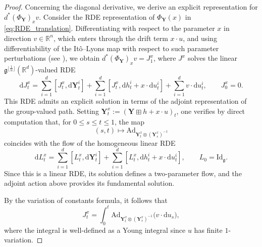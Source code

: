 \documentclass[12pt,a4paper]{article}
\numberwithin{equation}{section}
\def\fY{\mathbf{Y}}\newcommand{\norm}[1]{\left\lVert#1\right\rVert}
\theoremstyle{plain}
\theoremstyle{definition}
\theoremstyle{remark}
\begin{document}
\begin{proof}
Concerning the diagonal derivative, we derive an explicit representation for \( d^*(\Phi_\fY)_x v \). Consider the RDE representation of \( \Phi_\fY(x) \) in \eqref{eq:RDE_translation}. Differentiating with respect to the parameter \(x\) in direction \(v \in \mathbb{R}^n\), which enters through the drift term \(x \cdot u\), and using differentiability of the It\^{o}--Lyons map with respect to such parameter perturbations (see \cite[Theorem 11.6]{frizbook}), we obtain $d^* (\Phi_\fY)_x v=J_1^x$, where \(J^x\) solves the linear \(\mathfrak{g}^{\lfloor \frac{1}{\alpha}  \rfloor}(\mathbb{R}^d)\)-valued RDE
\begin{equation}\label{Lie_RDE}
\mathrm{d}J_t^x = \sum_{i=1}^d  [J_t^x, \mathrm{d}\mathbf{Y}^i_t]
+  \sum_{i=1}^d [J_t^x, \mathrm{d}h^i_t + x\cdot \mathrm{d}u_{t}^i]
+ \sum_{i=1}^d v \cdot \mathrm{d}u_{t}^i,
\qquad J_0^x = 0.
\end{equation}
This RDE admits an explicit solution in terms of the adjoint representation of the group-valued path. Setting \(\fY_t^x := (\fY \boxplus h + x\cdot u)_t\), one verifies by direct computation that, for \(0 \le s \le t \le 1\), the map
\[
(s,t) \mapsto \mathrm{Ad}_{\mathbf{Y}_t^x \otimes (\mathbf{Y}_s^x)^{-1}}
\]
coincides with the flow of the homogeneous linear RDE
\begin{equation}\label{Lie_RDE_2}
\mathrm{d} L_t^x = \sum_{i=1}^d  [L_t^x, \mathrm{d}\mathbf{Y}^i_t]
+  \sum_{i=1}^d [L_t^x, \mathrm{d}h^i_t + x\cdot \mathrm{d}u_{t}^i],
\qquad L_0 = \mathrm{Id}_{\mathfrak{g}}.
\end{equation}
Since this is a linear RDE, its solution defines a two-parameter flow, and the adjoint action above provides its fundamental solution.

By the variation of constants formula, it follows that
\[
J_t^x = \int_0^t \mathrm{Ad}_{\mathbf{Y}_t^x \otimes (\mathbf{Y}_s^x)^{-1}} \bigl( v \cdot \mathrm{d}u_s \bigr),
\]
where the integral is well-defined as a Young integral since \(u\) has finite \(1\)-variation.


\end{proof}
\end{document}

